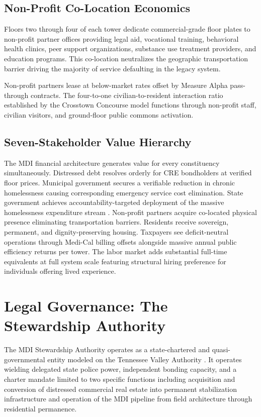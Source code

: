 \documentclass[12pt, letterpaper]{article}
\begin{document}
\subsection{Non-Profit Co-Location Economics}

Floors two through four of each tower dedicate commercial-grade floor plates to non-profit partner offices providing legal aid, vocational training, behavioral health clinics, peer support organizations, substance use treatment providers, and education programs. This co-location neutralizes the geographic transportation barrier driving the majority of service defaulting in the legacy system.

Non-profit partners lease at below-market rates offset by Measure Alpha pass-through contracts. The four-to-one civilian-to-resident interaction ratio established by the Crosstown Concourse model \citep{crosstown_concourse_2017} functions through non-profit staff, civilian visitors, and ground-floor public commons activation.

\subsection{Seven-Stakeholder Value Hierarchy}

The MDI financial architecture generates value for every constituency simultaneously. Distressed debt resolves orderly for CRE bondholders at verified floor prices. Municipal government secures a verifiable reduction in chronic homelessness causing corresponding emergency service cost elimination. State government achieves accountability-targeted deployment of the massive homelessness expenditure stream \citep{ca_24b_expenditure_2026}. Non-profit partners acquire co-located physical presence eliminating transportation barriers. Residents receive sovereign, permanent, and dignity-preserving housing. Taxpayers see deficit-neutral operations through Medi-Cal billing offsets alongside massive annual public efficiency returns per tower. The labor market adds substantial full-time equivalents at full system scale featuring structural hiring preference for individuals offering lived experience.

\clearpage
\section{Legal Governance: The Stewardship Authority}

The MDI Stewardship Authority operates as a state-chartered and quasi-governmental entity modeled on the Tennessee Valley Authority \citep{tva_act_1933}. It operates wielding delegated state police power, independent bonding capacity, and a charter mandate limited to two specific functions including acquisition and conversion of distressed commercial real estate into permanent stabilization infrastructure and operation of the MDI pipeline from field architecture through residential permanence.
\end{document}
